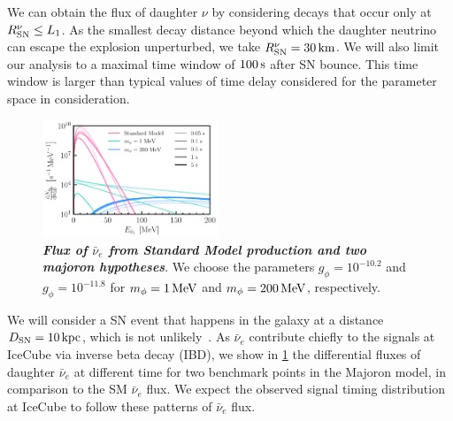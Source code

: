 We can obtain the flux of daughter $\nu$ by considering decays that occur only at $R^{\nu}_{\rm SN}\leq L_1$. As the smallest decay distance beyond which the daughter neutrino can escape the explosion unperturbed, we take $R^{\nu}_{\rm SN} = \unit[30]{km}$. We will also limit our analysis to a maximal time window of $\unit[100]{s}$ after SN bounce. This time window is larger than typical values of time delay considered for the parameter space in consideration.
\begin{figure}[t!]
    \centering
    \includegraphics[width=0.47\textwidth]{figures/majoran_fluxes.pdf}
    \caption{\textit{\textbf{Flux of $\bar{\nu}_{e}$ from Standard Model production and two majoron hypotheses}}.
    We choose the parameters $g_\phi = 10^{-10.2}$ and $g_\phi = 10^{-11.8}$ for $m_\phi = \unit[1]{MeV}$ and $m_\phi = \unit[200]{MeV}$, respectively. 
    }
    \label{fig:fluxes}
\end{figure}
We will consider a SN event that happens in the galaxy at a distance $D_{\rm SN}=\unit[10]{kpc}$, which is not unlikely~\cite{Reed:2005en,Rozwadowska:2020nab}. As $\bar{\nu}_e$ contribute chiefly to the signals at IceCube via inverse beta decay (IBD), we show in \cref{fig:fluxes} the differential fluxes of daughter $\bar{\nu}_e$ at different time for two benchmark points in the Majoron model, in comparison to the SM $\bar{\nu}_e$ flux. We expect the observed signal timing distribution at IceCube to follow these patterns of $\bar{\nu}_{e}$ flux. 

